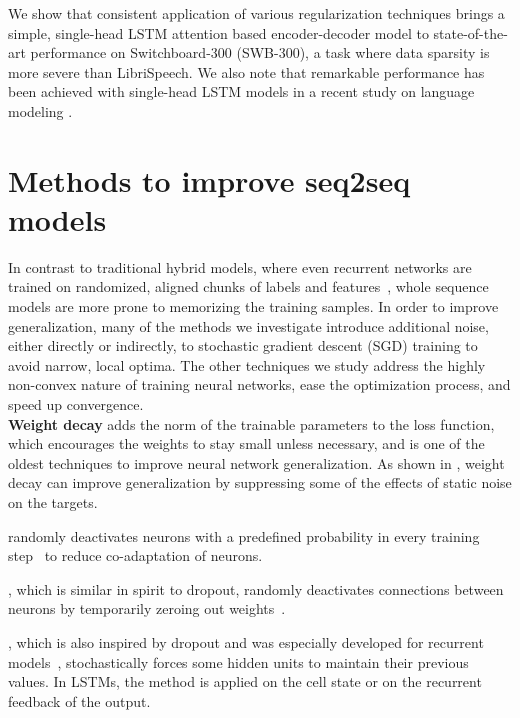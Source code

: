 \documentclass[a4paper]{article}
\begin{document}
We show that consistent application of various regularization techniques brings a simple, single-head LSTM attention based encoder-decoder model to state-of-the-art performance on Switchboard-300 (SWB-300), a task where data sparsity is more severe than LibriSpeech.
We also note that remarkable performance has been achieved with single-head LSTM models in a recent study on language modeling \cite{Merity2019}.












\renewcommand{\baselinestretch}{0.941}\normalsize
\section{Methods to improve seq2seq models}
\label{sec:methods}
In contrast to traditional hybrid models, where even recurrent networks are trained on randomized, aligned chunks of labels and features~\cite{Saon2014,Mohamed2015}, whole sequence models are more prone to memorizing the training samples.
In order to improve generalization, many of the methods we investigate introduce additional noise, either directly or indirectly, to stochastic gradient descent (SGD) training to avoid narrow, local optima.
The other techniques we study address the highly non-convex nature of training neural networks, ease the optimization process, and speed up convergence.
\\ {\bf Weight decay} adds the  norm of the trainable parameters to the loss function, which encourages the weights to stay small unless necessary, and is one of the oldest techniques to improve neural network generalization.
As shown in \cite{Krogh1992}, weight decay can improve generalization by suppressing some of the effects of static noise on the targets.

 randomly deactivates neurons with a predefined probability in every training step~\cite{hinton2012} to reduce co-adaptation of neurons.

, which is similar in spirit to dropout, randomly deactivates connections between neurons by temporarily zeroing out weights~\cite{pmlr-v28-wan13}.

, which is also inspired by dropout and was especially developed for recurrent models~\cite{Krueger2017}, stochastically forces some hidden units to maintain their previous values.
In LSTMs, the method is applied on the cell state or on the recurrent feedback of the output.
\end{document}
